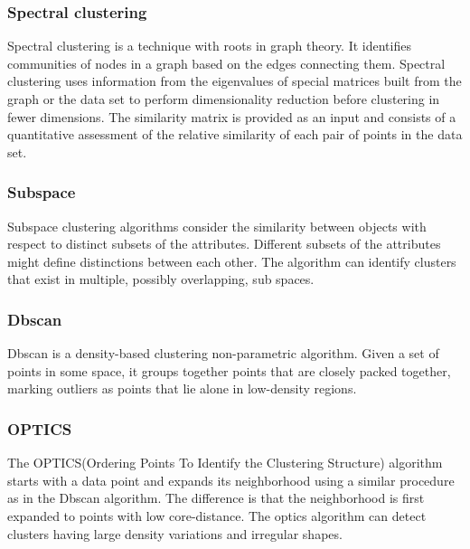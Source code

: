 \documentclass[../main]{subfiles}
\begin{document}
\subsubsection{Spectral clustering}
Spectral clustering is a technique with roots in graph theory.
It identifies communities of nodes in a graph based on the edges connecting them\cite{Filippone2008AClustering}.
Spectral clustering uses information from the eigenvalues of special matrices built from the graph or the data set  to perform dimensionality reduction before clustering in fewer dimensions\cite{Filippone2008AClustering}. 
The similarity matrix is provided as an input and consists of a quantitative assessment of the relative similarity of each pair of points in the data set\cite{Filippone2008AClustering}.
\subsubsection{Subspace}
Subspace clustering algorithms consider the similarity between objects with respect to distinct subsets of the attributes\cite{Hartigan1979AlgorithmAlgorithm}. 
Different subsets of the attributes might define distinctions between each other. 
The algorithm can identify clusters that exist in multiple, possibly overlapping, sub spaces\cite{M2016SUBSPACEDATA}.
\subsubsection{Dbscan}
Dbscan is a density-based clustering non-parametric algorithm\cite{Daszykowski2009}.
Given a set of points in some space, it groups together points that are closely packed together, marking outliers as points that lie alone in low-density regions\cite{Daszykowski2009}.
\subsubsection{OPTICS}
The OPTICS(Ordering Points To Identify the Clustering Structure) algorithm starts with a data point and expands its neighborhood using a similar procedure as in the Dbscan algorithm\cite{Ankerst1999OPTICS:Structure}.
The difference is that the neighborhood is first expanded to points with low core-distance\cite{Ankerst1999OPTICS:Structure}. 
The optics algorithm can detect clusters having large density variations and irregular shapes\cite{Ankerst1999OPTICS:Structure}.
\newline 
\end{document}
